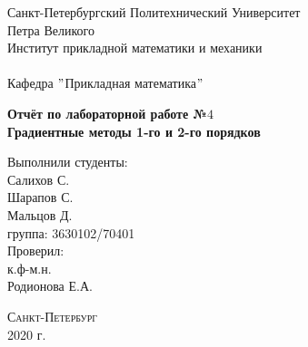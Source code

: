 \documentclass[a4]{article}
\begin{document}
	
	\begin{center} 
		\vspace{2cm} 
		{\Large \sc Санкт-Петербургский Политехнический Университет}\\
		\vspace{2mm}
		{\Large\sc Петра Великого}\\
		\vspace{1cm}
		{\large \sc Институт прикладной математики и механики\\ 
			\vspace{0.5mm}
			\textsc{}}\\ 
		\vspace{0.5mm}
		{\large\sc Кафедра $"$Прикладная математика$"$}\\
		\vspace{15mm}
		
		
		{\sc \textbf{
				Отчёт по лабораторной работе №$4$\\
				Градиентные методы 1-го и 2-го порядков}
			\vspace{6mm}
			
		}
		\vspace*{2mm}
		
		
		\begin{flushleft}
			\vspace{4cm}
			\sc Выполнили студенты:\\
			\sc Салихов С.\\
			\sc Шарапов С.\\
			\sc Мальцов Д.\\
			\sc группа: 3630102/70401\\
			\vspace{1cm}
			\sc Проверил:\\
			\sc к.ф-м.н.\\
			\sc Родионова Е.А.
			\vspace{20mm}
		\end{flushleft}
	\end{center} 
	\begin{center}
		\vfill {\large\textsc{Санкт-Петербург}}\\ 
		2020 г.
	\end{center}
\end{document}
